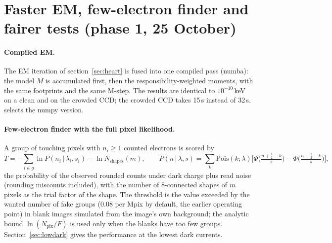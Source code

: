 \section{Faster EM, few-electron finder and fairer tests (phase 1, 25 October)}\label{sec:phase1}

\paragraph{Compiled EM.} The EM iteration of section~\ref{sec:heart} is fused into one compiled pass (numba): the
model $M$ is accumulated first, then the responsibility-weighted moments, with the same footprints and the same
M-step. The results are identical to $10^{-10}$\,keV on a clean and on the crowded CCD; the crowded CCD takes 15\,s
instead of 32\,s.  selects the numpy version.

\paragraph{Few-electron finder with the full pixel likelihood.} A group of touching pixels with $n_i\ge1$ counted
electrons is scored by
\begin{equation}
T=-\sum_{i\in g}\ln P(n_i\,|\,\lambda_i,s_i)-\ln N_\mathrm{shapes}(m),\qquad
P(n\,|\,\lambda,s)=\sum_k \mathrm{Pois}(k;\lambda)\Big[\Phi\big(\tfrac{n+\frac12-k}{s}\big)-\Phi\big(\tfrac{n-\frac12-k}{s}\big)\Big],
\end{equation}
the probability of the observed rounded counts under dark charge plus read noise (rounding miscounts included), with
the number of 8-connected shapes of $m$ pixels as the trial factor of the shape. The threshold is the value exceeded
by the wanted number of fake groups ($0.08$ per Mpix by default, the earlier operating point) in blank images
simulated from the image's own background; the analytic bound $\ln(N_\mathrm{pix}/F)$ is used only when the blanks
have too few groups. Section~\ref{sec:lowdark} gives the performance at the lowest dark currents.


